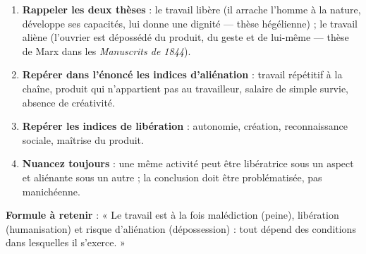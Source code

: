 \documentclass[11pt]{article}
\begin{document}
\begin{methode}
\begin{enumerate}
\item \textbf{Rappeler les deux thèses} : le travail libère (il arrache l'homme à la nature, développe ses capacités, lui donne une dignité — thèse hégélienne) ; le travail aliène (l'ouvrier est dépossédé du produit, du geste et de lui-même — thèse de Marx dans les \emph{Manuscrits de 1844}).
\item \textbf{Repérer dans l'énoncé les indices d'aliénation} : travail répétitif à la chaîne, produit qui n'appartient pas au travailleur, salaire de simple survie, absence de créativité.
\item \textbf{Repérer les indices de libération} : autonomie, création, reconnaissance sociale, maîtrise du produit.
\item \textbf{Nuancez toujours} : une même activité peut être libératrice sous un aspect et aliénante sous un autre ; la conclusion doit être problématisée, pas manichéenne.
\end{enumerate}
\textbf{Formule à retenir} : « Le travail est à la fois malédiction (peine), libération (humanisation) et risque d'aliénation (dépossession) : tout dépend des conditions dans lesquelles il s'exerce. »
\end{methode}
\end{document}
